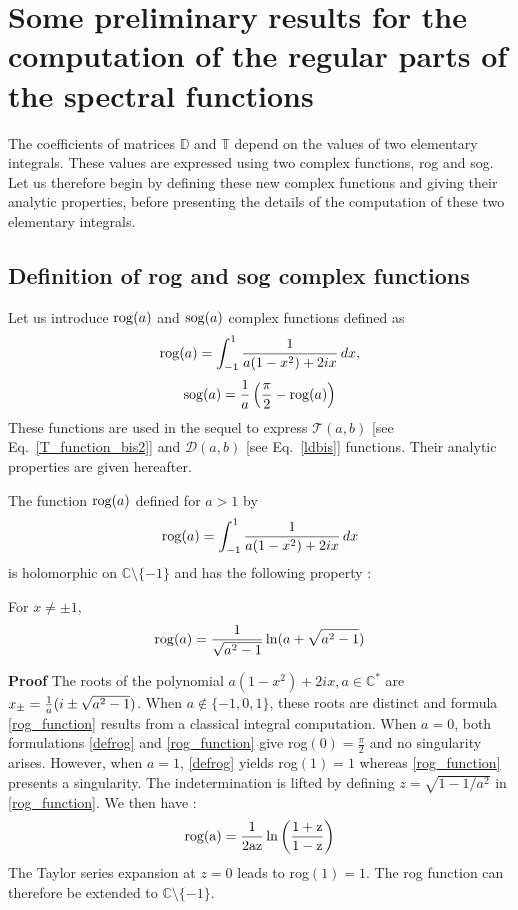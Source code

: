 \chapter[][Some preliminary results]{Some preliminary results for the computation of the regular parts of the spectral functions }
\label{Intégrale}

The coefficients of matrices $\mathbb{D}$ and $\mathbb{T}$ depend on the values of two elementary integrals. These values are expressed using two complex functions, rog and sog. Let us therefore begin by defining these new complex functions and giving their analytic properties, before presenting the details of the computation of these two elementary integrals.

\section{Definition of rog and sog complex functions}
\label{rogsog}
Let us introduce ${\rm rog}(a)$ and ${\rm sog}(a)$ complex functions defined as
\begin{equation}
\label{defrog}
{\rm rog}(a) =\int_{-1}^1 {1 \over a(1-x^2)+2ix} \, dx,
\end{equation}
\begin{equation}
\label{defsog}
{\rm sog}(a) = \dfrac{1}{a}\left( \dfrac{\pi}{2} - {\rm rog}(a)\right)
\end{equation}
These functions are used in the sequel to express $\mathcal{T}(a,b)$ [see Eq.~\eqref{T_function_bis2}] and $\mathcal{D}(a,b)$ [see Eq.~\eqref{ldbis}] functions. Their analytic properties are given hereafter.

\begin{lemma}
\label{lemma_rog}
The function ${\rm rog}(a)$ defined for $a > 1$ by
\begin{equation*}
 {\rm rog}(a)=\int_{-1}^1 {1 \over a(1-x^2)+2ix} \, dx
\end{equation*}
is holomorphic on $\mathbb C\setminus \{-1\}$ and has the following property : 

For $x\neq \pm 1$,
\begin{equation}
{\rm rog}(a) = \dfrac{1}{\sqrt{a^2 - 1}} \ln (a+\sqrt{a^2 -1})
\label{rog_function}
\end{equation}
\end{lemma}


{\bf Proof}
The roots of the polynomial $a(1-x^2)+2ix, a\in \mathbb C^* $ are $x_\pm={1\over a}(i\pm \sqrt {a^2-1})$. When $a \notin \{ -1,0,1\} $, these roots are distinct and  formula \eqref{rog_function} results from a classical integral computation. When $a=0$, both formulations \eqref{defrog} and \eqref{rog_function} give rog$(0)=\frac{\pi}{2}$ and no singularity arises. However, when $a=1$, \eqref{defrog} yields rog$(1)=1$ whereas \eqref{rog_function} presents a singularity. The indetermination is lifted by defining $z=\sqrt{1-1/a^2}$ in \eqref{rog_function}. We then have :
\begin{equation}
\rm rog(a)=\frac{1}{2az}\ln \left(\frac{1+z}{1-z}\right)
\end{equation}
The Taylor series expansion at $z=0$ leads to rog$(1)=1$. The rog function can therefore be extended to $\mathbb{C}\setminus \{-1\}$.

